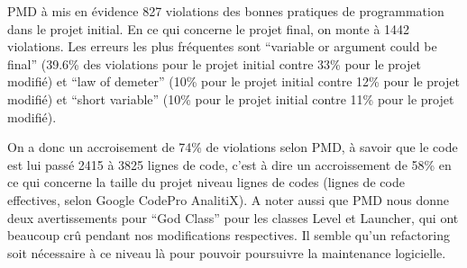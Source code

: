 \documentclass[a4paper,12pt]{report} %
\begin{document}
PMD à mis en évidence 827 violations des bonnes pratiques de programmation
dans le projet initial. En ce qui concerne le projet final, on monte
à 1442 violations. Les erreurs les plus fréquentes sont ``variable
or argument could be final'' (39.6\% des violations pour le projet
initial contre 33\% pour le projet modifié) et ``law of demeter''
(10\% pour le projet initial contre 12\% pour le projet modifié) et
``short variable'' (10\% pour le projet initial contre 11\% pour
le projet modifié).

On a donc un accroisement de 74\% de violations selon PMD, à savoir
que le code est lui passé 2415 à 3825 lignes de code, c'est à dire
un accroissement de 58\% en ce qui concerne la taille du projet niveau
lignes de codes (lignes de code effectives, selon Google CodePro AnalitiX).
A noter aussi que PMD nous donne deux avertissements pour ``God Class''
pour les classes Level et Launcher, qui ont beaucoup crû pendant nos
modifications respectives. Il semble qu'un refactoring soit nécessaire
à ce niveau là pour pouvoir poursuivre la maintenance logicielle.
\end{document}
